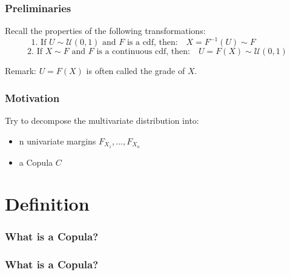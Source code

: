 \documentclass{beamer}
\begin{document}
\begin{frame}
\frametitle{Preliminaries}

Recall the properties of the following transformations:
\[\text{ }1. \text{ If  }U \sim \mathcal{U} (0, 1) \text{ and } F \text{ is a cdf, then:} \quad X = F^{-1}(U) \sim F \qquad \quad\quad\]
\[2.\text{ If  }X \sim F \text{ and } F \text{ is a continuous cdf, then:} \quad U = F(X) \sim \mathcal{U}(0, 1)\]

\vspace{20mm}
Remark: $ U =  F(X)$ is often called the grade of $X$.
\end{frame}






\begin{frame}
\frametitle{Motivation}

Try to decompose the multivariate distribution into:
\begin{itemize}
\item{n univariate margins $F_{X_1}, ..., F_{X_n}$}
\item{a Copula $C$} 
\end{itemize}

\end{frame}

\section{Definition}
\frame{\sectionpage}
\begin{frame}
\frametitle{What is a Copula?}
\begin{figure}[htbp]
\label{copsim}
\end{figure}
\end{frame}


\begin{frame}
\frametitle{What is a Copula?}
\begin{figure}[htbp]
\label{copsim2}
\end{figure}
\end{frame}
\end{document}
